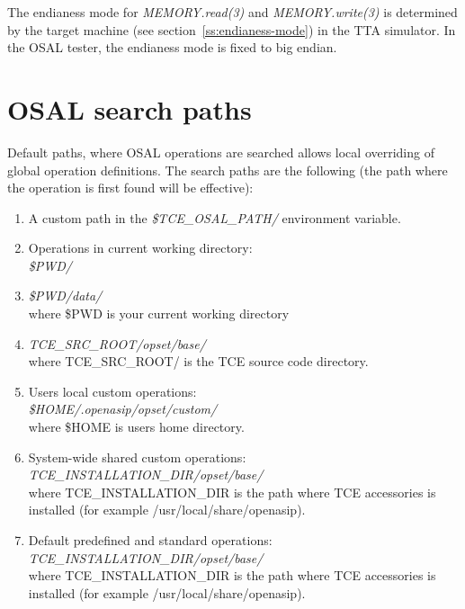 \documentclass[a4paper,twoside]{tceusermanual}
\begin{document}
The endianess mode for \emph{MEMORY.read(3)} and
\emph{MEMORY.write(3)} is determined by the target machine (see
section~\ref{ss:endianess-mode}) in the TTA simulator. In the OSAL
tester, the endianess mode is fixed to big endian.

\section{OSAL search paths}
\label{sec:osalpaths}

Default paths, where OSAL operations are searched allows local overriding of 
global operation definitions. The search paths are the following (the path
where the operation is first found will be effective):\\

\begin{enumerate}

\item
   A custom path in the \textit{\$TCE\_OSAL\_PATH/} environment variable. 

\item
   Operations in current working directory:\\
   \textit{\$PWD/}
      
\item
   \textit{\$PWD/data/} \\ where \$PWD is your current working directory
      

\item
   \textit{TCE\_SRC\_ROOT/opset/base/} \\ where TCE\_SRC\_ROOT/ is the
   TCE source code directory.

\item
   Users local custom operations: \\
   \textit{\$HOME/.openasip/opset/custom/} \\ where \$HOME is users home directory.

\item
   System-wide shared custom operations:
   \textit{TCE\_INSTALLATION\_DIR/opset/base/} \\ where
   TCE\_INSTALLATION\_DIR is the path where TCE accessories is installed (for
   example /usr/local/share/openasip).

\item
   Default predefined and standard operations: \\
   \textit{TCE\_INSTALLATION\_DIR/opset/base/} \\ where
   TCE\_INSTALLATION\_DIR is the path where TCE accessories is installed (for
   example /usr/local/share/openasip).

\end{enumerate}
\end{document}
